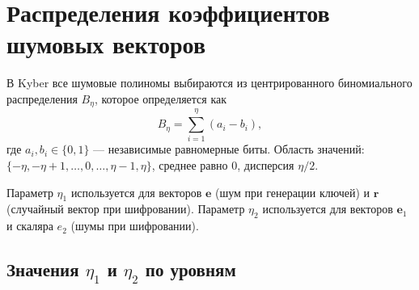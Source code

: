 \documentclass[11pt,a4paper]{article}
\begin{document}




\newpage
\section{Распределения коэффициентов шумовых векторов}

В Kyber все шумовые полиномы выбираются из центрированного биномиального распределения \(B_\eta\), которое определяется как
\[
    B_\eta = \sum_{i=1}^{\eta} (a_i - b_i),
\]
где \(a_i,b_i \in \{0,1\}\) — независимые равномерные биты. Область значений: \(\{-\eta,-\eta+1,\dots,0,\dots,\eta-1,\eta\}\), среднее равно \(0\), дисперсия \(\eta/2\).

Параметр \(\eta_1\) используется для векторов \(\mathbf{e}\) (шум при генерации ключей) и \(\mathbf{r}\) (случайный вектор при шифровании). Параметр \(\eta_2\) используется для векторов \(\mathbf{e}_1\) и скаляра \(e_2\) (шумы при шифровании).

\subsection{Значения \(\eta_1\) и \(\eta_2\) по уровням}
\end{document}
